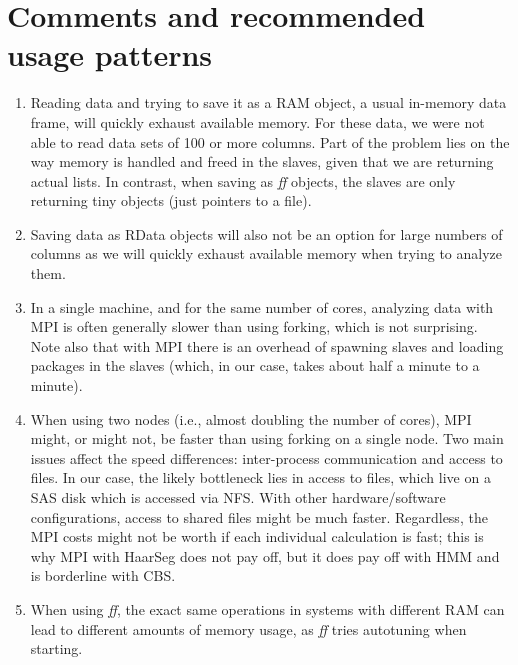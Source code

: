 \documentclass[a4paper,11pt]{article}
\begin{document}
            





\clearpage
\section{Comments and recommended usage patterns}
\label{commentsend}
\begin{enumerate}

\item Reading data and trying to save it as a RAM object, a usual
  in-memory data frame, will quickly exhaust available memory. For these
  data, we were not able to read data sets of 100 or more columns. Part of
  the problem lies on the way memory is handled and freed in the slaves,
  given that we are returning actual lists. In contrast, when saving as
  \textit{ff} objects, the slaves are only returning tiny objects (just
  pointers to a file).
  
\item Saving data as RData objects will also not be an option for large
  numbers of columns as we will quickly exhaust available memory when
  trying to analyze them. 
  
  
\item In a single machine, and for the same number of cores, analyzing
  data with MPI is often generally slower than using forking, which is not
  surprising. Note also that with MPI there is an overhead of spawning
  slaves and loading packages in the slaves (which, in our case, takes
  about half a minute to a minute). %
  
  
\item When using two nodes (i.e., almost doubling the number of cores),
  MPI might, or might not, be faster than using forking on a single
  node. Two main issues affect the speed differences: inter-process
  communication and access to files. In our case, the likely bottleneck
  lies in access to files, which live on a SAS disk which is accessed via
  NFS. With other hardware/software configurations, access to shared files
  might be much faster. Regardless, the MPI costs might not be worth if
  each individual calculation is fast; this is why MPI with HaarSeg does
  not pay off, but it does pay off with HMM and is borderline with CBS.
  
  
\item When using \textit{ff}, the exact same operations in systems with
  different RAM can lead to different amounts of memory usage, as
  \textit{ff} tries autotuning when starting. 


\end{enumerate}
\end{document}
